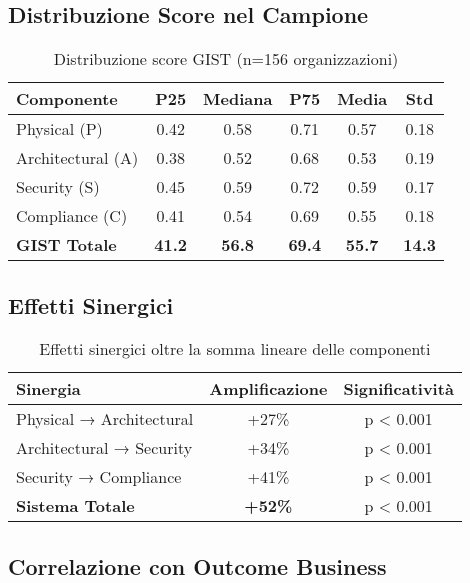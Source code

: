 \subsection{\texorpdfstring{Distribuzione Score nel Campione}{C.4.1 - Distribuzione Score nel Campione}}

\begin{table}[htbp]
\centering
\begin{tabular}{lccccc}
\toprule
\textbf{Componente} & \textbf{P25} & \textbf{Mediana} & \textbf{P75} & \textbf{Media} & \textbf{Std} \\
\midrule
Physical (P) & 0.42 & 0.58 & 0.71 & 0.57 & 0.18 \\
Architectural (A) & 0.38 & 0.52 & 0.68 & 0.53 & 0.19 \\
Security (S) & 0.45 & 0.59 & 0.72 & 0.59 & 0.17 \\
Compliance (C) & 0.41 & 0.54 & 0.69 & 0.55 & 0.18 \\
\textbf{GIST Totale} & \textbf{41.2} & \textbf{56.8} & \textbf{69.4} & \textbf{55.7} & \textbf{14.3} \\
\bottomrule
\end{tabular}
\caption{Distribuzione score GIST (n=156 organizzazioni)}
\end{table}

\subsection{\texorpdfstring{Effetti Sinergici}{C.4.2 - Effetti Sinergici}}

\begin{table}[htbp]
\centering
\begin{tabular}{lcc}
\toprule
\textbf{Sinergia} & \textbf{Amplificazione} & \textbf{Significatività} \\
\midrule
Physical → Architectural & +27\% & p < 0.001 \\
Architectural → Security & +34\% & p < 0.001 \\
Security → Compliance & +41\% & p < 0.001 \\
\textbf{Sistema Totale} & \textbf{+52\%} & p < 0.001 \\
\bottomrule
\end{tabular}
\caption{Effetti sinergici oltre la somma lineare delle componenti}
\end{table}

\subsection{\texorpdfstring{Correlazione con Outcome Business}{C.4.3 - Correlazione con Outcome Business}}

